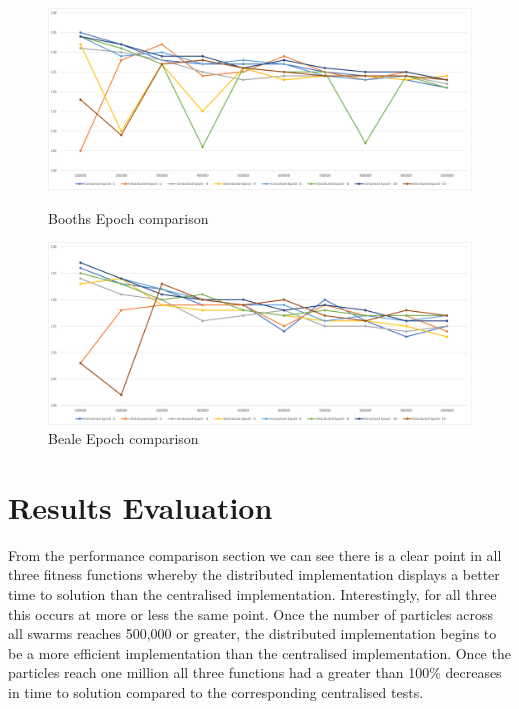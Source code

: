 \documentclass[oneside,12pt]{book}
\begin{document}
\begin{figure}[H]
  \centering
  \begin{minipage}[b]{0.48\textwidth}
    \includegraphics[width=\textwidth]{Images/Graphs/PerformanceComparisonBoothsEpoch.png}
    \caption{Booths Epoch comparison}
    \label{fig:PerformanceComparisonBoothsEpoch}
  \end{minipage}
  \hfill
  \begin{minipage}[b]{0.48\textwidth}
    \includegraphics[width=\textwidth]{Images/Graphs/PerformanceComparisonBealeEpoch.png}
    \caption{Beale Epoch comparison}
    \label{fig:PerformanceComparisonBealeEpoch}
  \end{minipage}
\end{figure}

\section{Results Evaluation}
From the performance comparison section we can see there is a clear point in all three fitness functions whereby the distributed implementation displays a better time to solution than the centralised implementation. Interestingly, for all three this occurs at more or less the same point. Once the number of particles across all swarms reaches 500,000 or greater, the distributed implementation begins to be a more efficient implementation than the centralised implementation. Once the particles reach one million all three functions had a greater than 100\% decreases in time to solution compared to the corresponding centralised tests.
\end{document}
